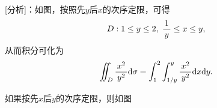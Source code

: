 \begin{center}
\end{center}

[分析]：如图，按照先$y$后$x$的次序定限，可得
$$D:1\leq y\leq 2,\;\df1y\leq x\leq y,$$
从而积分可化为
$$\iint_D\df{x^2}{y^2}\d\sigma
=\dint_1^2\dint_{1/y}^y\df{x^2}{y^2}\d x\d y.$$

如果按先$x$后$y$的次序定限，则如图

\begin{center}
\end{center}

